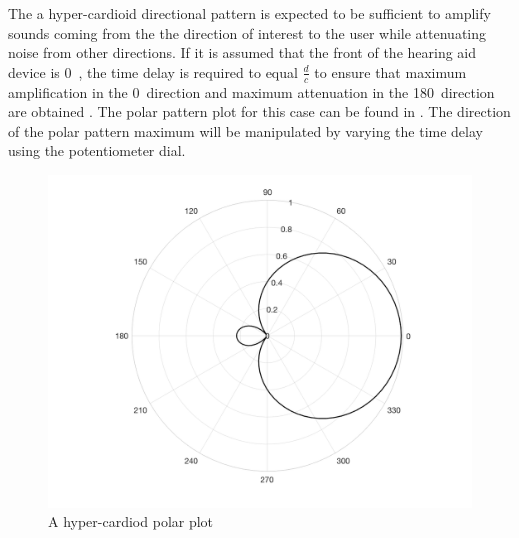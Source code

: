 \documentclass[10pt,twocolumn]{witseiepaper}
\begin{document}
The a hyper-cardioid directional pattern is expected to be sufficient to amplify sounds coming from the the direction of interest to the user while attenuating noise from other directions. If it is assumed that the front of the hearing aid device is 0\textdegree\ , the time delay is required to equal $\frac{d}{c}$ to ensure that maximum amplification in the 0\textdegree\ direction and maximum attenuation in the 180\textdegree\ direction are obtained \cite{Distortion_of_interaural_time_cues}. The polar pattern plot for this case can be found in . The direction of the polar pattern maximum will be manipulated by varying the time delay using the potentiometer dial. 

\begin{figure}[h]
	\centering
	\includegraphics[width=0.9\columnwidth]{polarPlot.png}
	\caption{A hyper-cardiod polar plot}
	\raggedright
	\label{fig:polar}	
\end{figure}
\end{document}
